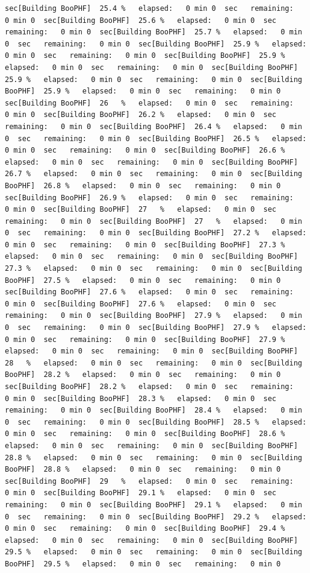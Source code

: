 \documentclass[
]{book}
\begin{document}
\begin{verbatim}
sec[Building BooPHF]  25.4 %   elapsed:   0 min 0  sec   remaining:   0 min 0  sec[Building BooPHF]  25.6 %   elapsed:   0 min 0  sec   remaining:   0 min 0  sec[Building BooPHF]  25.7 %   elapsed:   0 min 0  sec   remaining:   0 min 0  sec[Building BooPHF]  25.9 %   elapsed:   0 min 0  sec   remaining:   0 min 0  sec[Building BooPHF]  25.9 %   elapsed:   0 min 0  sec   remaining:   0 min 0  sec[Building BooPHF]  25.9 %   elapsed:   0 min 0  sec   remaining:   0 min 0  sec[Building BooPHF]  25.9 %   elapsed:   0 min 0  sec   remaining:   0 min 0  sec[Building BooPHF]  26   %   elapsed:   0 min 0  sec   remaining:   0 min 0  sec[Building BooPHF]  26.2 %   elapsed:   0 min 0  sec   remaining:   0 min 0  sec[Building BooPHF]  26.4 %   elapsed:   0 min 0  sec   remaining:   0 min 0  sec[Building BooPHF]  26.5 %   elapsed:   0 min 0  sec   remaining:   0 min 0  sec[Building BooPHF]  26.6 %   elapsed:   0 min 0  sec   remaining:   0 min 0  sec[Building BooPHF]  26.7 %   elapsed:   0 min 0  sec   remaining:   0 min 0  sec[Building BooPHF]  26.8 %   elapsed:   0 min 0  sec   remaining:   0 min 0  sec[Building BooPHF]  26.9 %   elapsed:   0 min 0  sec   remaining:   0 min 0  sec[Building BooPHF]  27   %   elapsed:   0 min 0  sec   remaining:   0 min 0  sec[Building BooPHF]  27   %   elapsed:   0 min 0  sec   remaining:   0 min 0  sec[Building BooPHF]  27.2 %   elapsed:   0 min 0  sec   remaining:   0 min 0  sec[Building BooPHF]  27.3 %   elapsed:   0 min 0  sec   remaining:   0 min 0  sec[Building BooPHF]  27.3 %   elapsed:   0 min 0  sec   remaining:   0 min 0  sec[Building BooPHF]  27.5 %   elapsed:   0 min 0  sec   remaining:   0 min 0  sec[Building BooPHF]  27.6 %   elapsed:   0 min 0  sec   remaining:   0 min 0  sec[Building BooPHF]  27.6 %   elapsed:   0 min 0  sec   remaining:   0 min 0  sec[Building BooPHF]  27.9 %   elapsed:   0 min 0  sec   remaining:   0 min 0  sec[Building BooPHF]  27.9 %   elapsed:   0 min 0  sec   remaining:   0 min 0  sec[Building BooPHF]  27.9 %   elapsed:   0 min 0  sec   remaining:   0 min 0  sec[Building BooPHF]  28   %   elapsed:   0 min 0  sec   remaining:   0 min 0  sec[Building BooPHF]  28.2 %   elapsed:   0 min 0  sec   remaining:   0 min 0  sec[Building BooPHF]  28.2 %   elapsed:   0 min 0  sec   remaining:   0 min 0  sec[Building BooPHF]  28.3 %   elapsed:   0 min 0  sec   remaining:   0 min 0  sec[Building BooPHF]  28.4 %   elapsed:   0 min 0  sec   remaining:   0 min 0  sec[Building BooPHF]  28.5 %   elapsed:   0 min 0  sec   remaining:   0 min 0  sec[Building BooPHF]  28.6 %   elapsed:   0 min 0  sec   remaining:   0 min 0  sec[Building BooPHF]  28.8 %   elapsed:   0 min 0  sec   remaining:   0 min 0  sec[Building BooPHF]  28.8 %   elapsed:   0 min 0  sec   remaining:   0 min 0  sec[Building BooPHF]  29   %   elapsed:   0 min 0  sec   remaining:   0 min 0  sec[Building BooPHF]  29.1 %   elapsed:   0 min 0  sec   remaining:   0 min 0  sec[Building BooPHF]  29.1 %   elapsed:   0 min 0  sec   remaining:   0 min 0  sec[Building BooPHF]  29.2 %   elapsed:   0 min 0  sec   remaining:   0 min 0  sec[Building BooPHF]  29.4 %   elapsed:   0 min 0  sec   remaining:   0 min 0  sec[Building BooPHF]  29.5 %   elapsed:   0 min 0  sec   remaining:   0 min 0  sec[Building BooPHF]  29.5 %   elapsed:   0 min 0  sec   remaining:   0 min 0  
\end{verbatim}
\end{document}
